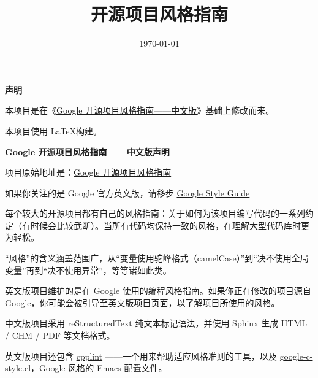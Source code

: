 \documentclass[UTF8,a4paper,oneside]{ctexbook}
\title{\deepin 开源项目风格指南}
\date{\today}
\author{\deepin}
\begin{document}
\maketitle

\textbf{声明}

本项目是在《\href{https://github.com/zh-google-styleguide/zh-google-styleguide}{Google 开源项目风格指南——中文版}》基础上修改而来。

本项目使用 \LaTeX 构建。

\begin{DNote}

\textbf{Google 开源项目风格指南——中文版声明}

项目原始地址是：\href{https://github.com/zh-google-styleguide/zh-google-styleguide}{Google 开源项目风格指南}

如果你关注的是 Google 官方英文版，请移步 \href{https://github.com/google/styleguide}{Google Style Guide}

每个较大的开源项目都有自己的风格指南：关于如何为该项目编写代码的一系列约定（有时候会比较武断）。当所有代码均保持一致的风格，在理解大型代码库时更为轻松。

“风格”的含义涵盖范围广，从“变量使用驼峰格式（camelCase）”到“决不使用全局变量”再到“决不使用异常”，等等诸如此类。

英文版项目维护的是在 Google 使用的编程风格指南。如果你正在修改的项目源自 Google，你可能会被引导至英文版项目页面，以了解项目所使用的风格。

中文版项目采用 reStructuredText 纯文本标记语法，并使用 Sphinx 生成 HTML / CHM / PDF 等文档格式。

英文版项目还包含 \href{https://github.com/google/styleguide/tree/gh-pages/cpplint}{cpplint} ——一个用来帮助适应风格准则的工具，以及 \href{https://raw.githubusercontent.com/google/styleguide/gh-pages/google-c-style.el}{google-c-style.el}，Google 风格的 Emacs 配置文件。

\end{DNote}

\tableofcontents
\newpage





\end{document}
